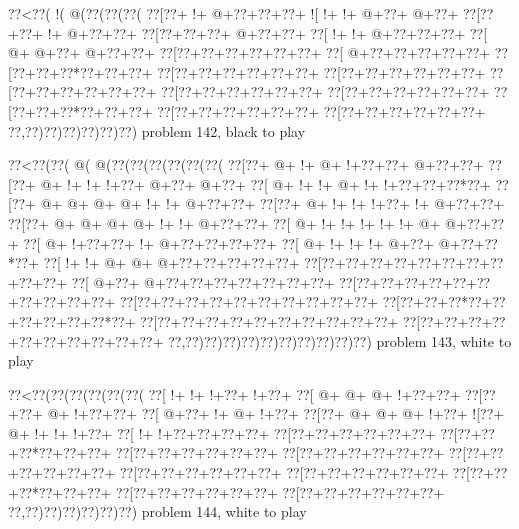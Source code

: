 \vbox{\vbox{\goo
\0??<\0??(\- !(\- @(\0??(\0??(\0??(
\0??[\0??+\- !+\- @+\0??+\0??+\0??+
\- ![\- !+\- !+\- @+\0??+\- @+\0??+
\0??[\0??+\0??+\- !+\- @+\0??+\0??+
\0??[\0??+\0??+\0??+\- @+\0??+\0??+
\0??[\- !+\- !+\- @+\0??+\0??+\0??+
\0??[\- @+\- @+\0??+\- @+\0??+\0??+
\0??[\0??+\0??+\0??+\0??+\0??+\0??+
\0??[\- @+\0??+\0??+\0??+\0??+\0??+
\0??[\0??+\0??+\0??*\0??+\0??+\0??+
\0??[\0??+\0??+\0??+\0??+\0??+\0??+
\0??[\0??+\0??+\0??+\0??+\0??+\0??+
\0??[\0??+\0??+\0??+\0??+\0??+\0??+
\0??[\0??+\0??+\0??+\0??+\0??+\0??+
\0??[\0??+\0??+\0??+\0??+\0??+\0??+
\0??[\0??+\0??+\0??*\0??+\0??+\0??+
\0??[\0??+\0??+\0??+\0??+\0??+\0??+
\0??[\0??+\0??+\0??+\0??+\0??+\0??+
\0??,\0??)\0??)\0??)\0??)\0??)\0??)
}
\hfil problem 142, black to play\hfil\break
}

\vbox{\vbox{\goo
\0??<\0??(\0??(\- @(\- @(\0??(\0??(\0??(\0??(\0??(\0??(
\0??[\0??+\- @+\- !+\- @+\- !+\0??+\0??+\- @+\0??+\0??+
\0??[\0??+\- @+\- !+\- !+\- !+\0??+\- @+\0??+\- @+\0??+
\0??[\- @+\- !+\- !+\- @+\- !+\- !+\0??+\0??+\0??*\0??+
\0??[\0??+\- @+\- @+\- @+\- @+\- !+\- !+\- @+\0??+\0??+
\0??[\0??+\- @+\- !+\- !+\- !+\0??+\- !+\- @+\0??+\0??+
\0??[\0??+\- @+\- @+\- @+\- @+\- !+\- !+\- @+\0??+\0??+
\0??[\- @+\- !+\- !+\- !+\- !+\- !+\- @+\- @+\0??+\0??+
\0??[\- @+\- !+\0??+\0??+\- !+\- @+\0??+\0??+\0??+\0??+
\0??[\- @+\- !+\- !+\- !+\- @+\0??+\- @+\0??+\0??*\0??+
\0??[\- !+\- !+\- @+\- @+\- @+\0??+\0??+\0??+\0??+\0??+
\0??[\0??+\0??+\0??+\0??+\0??+\0??+\0??+\0??+\0??+\0??+
\0??[\- @+\0??+\- @+\0??+\0??+\0??+\0??+\0??+\0??+\0??+
\0??[\0??+\0??+\0??+\0??+\0??+\0??+\0??+\0??+\0??+\0??+
\0??[\0??+\0??+\0??+\0??+\0??+\0??+\0??+\0??+\0??+\0??+
\0??[\0??+\0??+\0??*\0??+\0??+\0??+\0??+\0??+\0??*\0??+
\0??[\0??+\0??+\0??+\0??+\0??+\0??+\0??+\0??+\0??+\0??+
\0??[\0??+\0??+\0??+\0??+\0??+\0??+\0??+\0??+\0??+\0??+
\0??,\0??)\0??)\0??)\0??)\0??)\0??)\0??)\0??)\0??)\0??)
}
\hfil problem 143, white to play\hfil\break
}

\vbox{\vbox{\goo
\0??<\0??(\0??(\0??(\0??(\0??(\0??(
\0??[\- !+\- !+\- !+\0??+\- !+\0??+
\0??[\- @+\- @+\- @+\- !+\0??+\0??+
\0??[\0??+\0??+\- @+\- !+\0??+\0??+
\0??[\- @+\0??+\- !+\- @+\- !+\0??+
\0??[\0??+\- @+\- @+\- @+\- !+\0??+
\- ![\0??+\- @+\- !+\- !+\- !+\0??+
\0??[\- !+\- !+\0??+\0??+\0??+\0??+
\0??[\0??+\0??+\0??+\0??+\0??+\0??+
\0??[\0??+\0??+\0??*\0??+\0??+\0??+
\0??[\0??+\0??+\0??+\0??+\0??+\0??+
\0??[\0??+\0??+\0??+\0??+\0??+\0??+
\0??[\0??+\0??+\0??+\0??+\0??+\0??+
\0??[\0??+\0??+\0??+\0??+\0??+\0??+
\0??[\0??+\0??+\0??+\0??+\0??+\0??+
\0??[\0??+\0??+\0??*\0??+\0??+\0??+
\0??[\0??+\0??+\0??+\0??+\0??+\0??+
\0??[\0??+\0??+\0??+\0??+\0??+\0??+
\0??,\0??)\0??)\0??)\0??)\0??)\0??)
}
\hfil problem 144, white to play\hfil\break
}

